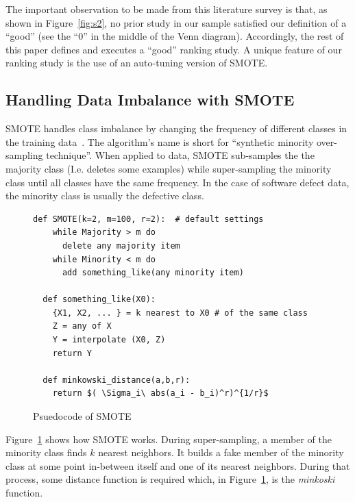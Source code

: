\documentclass[10pt,conference]{IEEEtran}
\theoremstyle{break}
\theoremstyle{break}
\begin{document}
The important   observation to be made from  this literature
survey is that, as shown in Figure~\ref{fig:s2}, no prior study in our sample satisfied  our definition of a ``good'' (see the ``0'' in the middle of the Venn diagram).
Accordingly, the rest of this
paper defines and executes a ``good'' ranking  study. A unique feature of our
ranking study is the use of an auto-tuning version of SMOTE.
 
 
\subsection{Handling Data Imbalance with SMOTE}
\label{sect:smote}

SMOTE handles class imbalance by changing the frequency of different classes in the training
data~\cite{chawla2002smote}. 
The algorithm's name is short for ``synthetic minority over-sampling technique''.
When applied to data, SMOTE sub-samples the 
the majority class (I.e. deletes some examples)
while super-sampling the minority class
until
all classes have the same frequency.  In the case of software defect data,
the minority class is usually the  defective class.



\begin{figure}[!htbp]
\scriptsize
\begin{lstlisting}[mathescape,linewidth=8.2cm,frame=r,numbers=right]
  def SMOTE(k=2, m=100, r=2):  # default settings
    while Majority > m do
      delete any majority item
    while Minority < m do
      add something_like(any minority item)
      
  def something_like(X0): 
    {X1, X2, ... } = k nearest to X0 # of the same class
    Z = any of X
    Y = interpolate (X0, Z)
    return Y
    
  def minkowski_distance(a,b,r):
    return $( \Sigma_i\ abs(a_i - b_i)^r)^{1/r}$
\end{lstlisting}
\caption{Psuedocode of SMOTE}
\label{fig:pseudocode}  
\end{figure}



Figure~\ref{fig:pseudocode} shows how SMOTE works. During super-sampling,
a member of the minority class finds $k$ nearest neighbors. It builds a fake member
of the minority class at some point in-between itself and one of its nearest
neighbors.  During that process, some distance function is required which, in Figure~\ref{fig:pseudocode}, is the {\em minkoski} function. 
\end{document}
